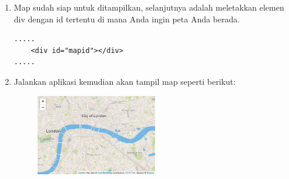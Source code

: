 \begin{enumerate}
    \item Map sudah siap untuk ditampilkan, selanjutnya adalah meletakkan elemen div dengan id tertentu di mana Anda ingin peta Anda berada.
\begin{lstlisting}[caption=Elemen div map Leaflet]
.....
    <div id="mapid"></div>
.....
\end{lstlisting}

    \item Jalankan aplikasi kemudian akan tampil map seperti berikut:
	\begin{figure}[!htbp]
		\centering
		\includegraphics[width=0.5\textwidth]{figures/LEAFLETJS/LJS1.png}
		\label{Leaflet1}
	\end{figure}
\end{enumerate}





